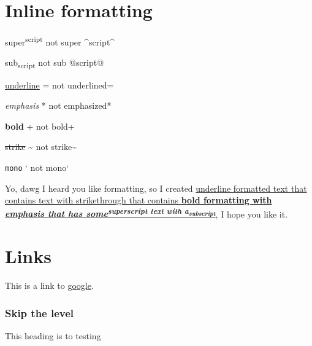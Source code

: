 \section{\label{inline-formatting}Inline formatting}
\par super\textsuperscript{script} not super {\textasciicircum}script{\textasciicircum}
\par sub\textsubscript{script} not sub @script@
\par \ul{underline}  = not underlined=
\par \emph{emphasis} * not emphasized*
\par \textbf{bold} + not bold+
\par \st{strike} {\textasciitilde} not strike{\textasciitilde}
\par \texttt{mono} ` not mono`
\par Yo, dawg I heard you like formatting, so I created \ul{underline formatted text that contains text with strikethrough that contains \textbf{bold formatting with \emph{emphasis that has some\textsuperscript{superscript text with a\textsubscript{subscript}}}}}, I hope you like it.
\section{\label{links}Links}
\par This is a link to \href{https://www.google.com}{google}.
\subsubsection{\label{skip-the-level}Skip the level}
\par This heading is to testing 